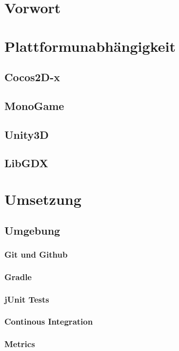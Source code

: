 \section{Vorwort}									
\section{Plattformunabhängigkeit}					
	\subsection{Cocos2D-x}							
	\subsection{MonoGame}							
	\subsection{Unity3D}							
	\subsection{LibGDX}								
\section{Umsetzung}
	\subsection{Umgebung}
		\subsubsection{Git und Github}				
		\subsubsection{Gradle}						
		\subsubsection{jUnit Tests}					
		\subsubsection{Continous Integration}		
		\subsubsection{Metrics}						
